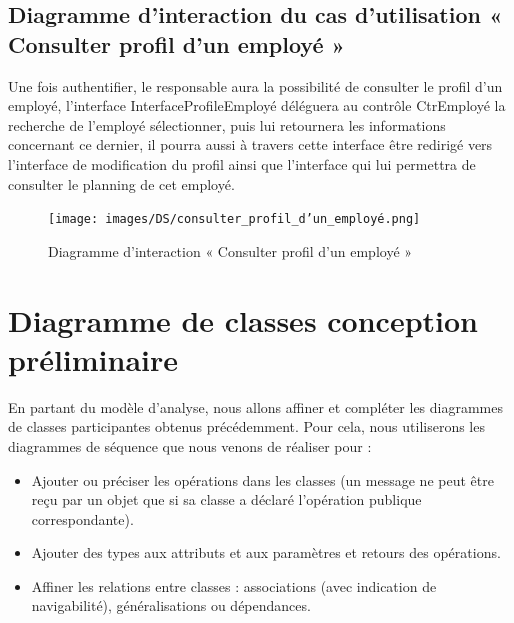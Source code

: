        \subsection*{Diagramme d'interaction du cas d'utilisation « Consulter profil d'un employé »}
        Une fois authentifier, le responsable aura la possibilité de consulter le profil d’un employé, l’interface InterfaceProfileEmployé déléguera au contrôle CtrEmployé la recherche de l’employé sélectionner, puis lui retournera les informations concernant ce dernier, il pourra aussi à travers cette interface être redirigé vers l’interface de modification du profil ainsi que l’interface qui lui permettra de consulter le planning de cet employé.
        
        \clearpage
        
        \begin{figure}[h!]
                 \centering
                \texttt{[image: images/DS/consulter\_profil\_d'un\_employé.png]}
                 \caption{Diagramme d'interaction « Consulter profil d'un employé »}
                 \label{fig42}
        \end{figure}
    
\section{Diagramme de classes conception préliminaire}
En partant du modèle d’analyse, nous allons affiner et compléter les diagrammes de classes participantes obtenus précédemment. Pour cela, nous utiliserons les diagrammes de séquence que nous venons de réaliser pour :
    \begin{itemize}
        \item [\textbullet] Ajouter ou préciser les opérations dans les classes (un message ne peut être reçu par un objet que si sa classe a déclaré l’opération publique correspondante).
        
        \item [\textbullet] Ajouter des types aux attributs et aux paramètres et retours des opérations. 
        
        \item [\textbullet] Affiner les relations entre classes : associations (avec indication de navigabilité), généralisations ou dépendances.\cite{5}
                    
    \end{itemize}
    
    \clearpage

